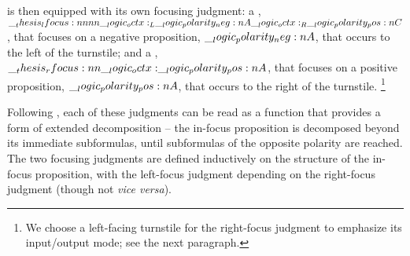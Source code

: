  is then equipped with its own focusing judgment: a , $\__thesis_lfocus:nnnn {\__logic_octx:_L} {\__logic_polarity_neg:n {A}} {\__logic_octx:_R} {\__logic_polarity_pos:n {C}}$, that focuses on a negative proposition, $\__logic_polarity_neg:n {A}$, that occurs to the left of the turnstile; and a , $\__thesis_rfocus:nn {\__logic_octx:} {\__logic_polarity_pos:n {A}}$, that focuses on a positive proposition, $\__logic_polarity_pos:n {A}$, that occurs to the right of the turnstile.%
\footnote{We choose a left-facing turnstile for the right-focus judgment to emphasize its input/output mode; see the next paragraph.}

Following \textcite{Zeilberger:POPL08}, each of these judgments can be read as a function that provides a form of extended decomposition -- the in-focus proposition is decomposed beyond its immediate subformulas, until subformulas of the opposite polarity are reached.
% 
The two focusing judgments are defined inductively on the structure of the in-focus proposition, with the left-focus judgment depending on the right-focus judgment (though not \emph{vice versa}).

